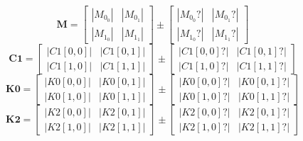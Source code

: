 \documentclass[landscape]{article}
\begin{document}
\begin{equation}
\mathbf{M}=
\left[
\begin{array}{rr}
    |M_0_0| & |M_0_1|\\
    |M_1_0| & |M_1_1|
\end{array}
\right]
\pm
\left[
\begin{array}{rr}
    |M_0_0?| & |M_0_1?|\\
    |M_1_0?| & |M_1_1?|
\end{array}
\right]
\label{eq:M}
\end{equation}
\begin{equation}
\mathbf{C1}=
\left[
\begin{array}{rr}
    |C1[0, 0]| & |C1[0, 1]|\\
    |C1[1, 0]| & |C1[1, 1]|
\end{array}
\right]
\pm
\left[
\begin{array}{rr}
    |C1[0, 0]?| & |C1[0, 1]?|\\
    |C1[1, 0]?| & |C1[1, 1]?|
\end{array}
\right]
\label{eq:C1}
\end{equation}
\begin{equation}
\mathbf{K0}=
\left[
\begin{array}{rr}
    |K0[0, 0]| & |K0[0, 1]|\\
    |K0[1, 0]| & |K0[1, 1]|
\end{array}
\right]
\pm
\left[
\begin{array}{rr}
    |K0[0, 0]?| & |K0[0, 1]?|\\
    |K0[1, 0]?| & |K0[1, 1]?|
\end{array}
\right]
\label{eq:K0}
\end{equation}
\begin{equation}
\mathbf{K2}=
\left[
\begin{array}{rr}
    |K2[0, 0]| & |K2[0, 1]|\\
    |K2[1, 0]| & |K2[1, 1]|
\end{array}
\right]
\pm
\left[
\begin{array}{rr}
    |K2[0, 0]?| & |K2[0, 1]?|\\
    |K2[1, 0]?| & |K2[1, 1]?|
\end{array}
\right]
\label{eq:K2}
\end{equation}
\end{document}
